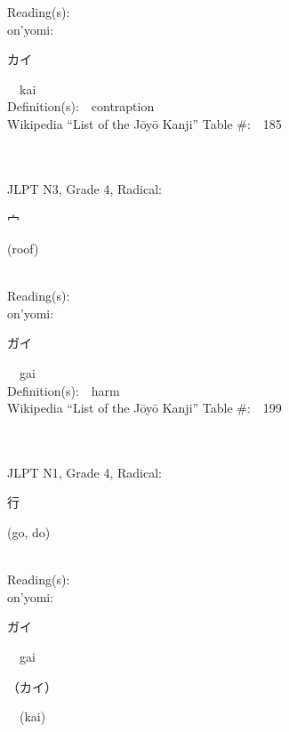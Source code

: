 \begin{multicols}{2}
Reading(s):\ \ \\
{\hspace*{1em}}on'yomi:\ \ \\
{\hspace*{2em}}{\begin{CJK}{UTF8}{min} カイ \end{CJK}}\ \ kai\ \ \\
Definition(s):\ \ contraption \\
Wikipedia ``List of the J\=oy\=o Kanji'' Table \#:\ \ 185 \\
\ \ \\
{\fontsize{34pt}{40pt}  }\ \ \\  %
{JLPT N3, Grade 4, Radical:\ \ {\begin{CJK}{UTF8}{min} 宀 \end{CJK}} (roof) } \\
Reading(s):\ \ \\
{\hspace*{1em}}on'yomi:\ \ \\
{\hspace*{2em}}{\begin{CJK}{UTF8}{min} ガイ \end{CJK}}\ \ gai\ \ \\
Definition(s):\ \ harm \\
Wikipedia ``List of the J\=oy\=o Kanji'' Table \#:\ \ 199 \\
\ \ \\
{\fontsize{34pt}{40pt}  }\ \ \\  %
{JLPT N1, Grade 4, Radical:\ \ {\begin{CJK}{UTF8}{min} 行 \end{CJK}} (go, do) } \\
Reading(s):\ \ \\
{\hspace*{1em}}on'yomi:\ \ \\
{\hspace*{2em}}{\begin{CJK}{UTF8}{min} ガイ \end{CJK}}\ \ gai\ \ \\
{\hspace*{2em}}{\begin{CJK}{UTF8}{min} （カイ） \end{CJK}}\ \ (kai)\ \ \\

\end{multicols}
